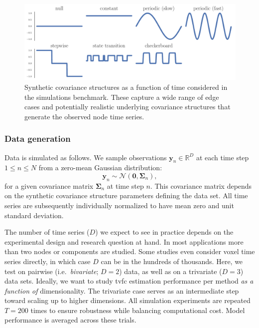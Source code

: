 \begin{figure}[t]
  \centering
  \includegraphics[width=\textwidth]{fig/sim/covariance_structures}
  \caption{
    Synthetic covariance structures as a function of time considered in the simulations benchmark.
    These capture a wide range of edge cases and potentially realistic underlying covariance structures that generate the observed node time series.
  }\label{fig:synthetic-covariance-structures}
\end{figure}


\subsubsection{Data generation}

Data is simulated as follows.
We sample observations $\mathbf{y}_n \in \mathbb{R}^D$ at each time step~$1 \leq n \leq N$ from a zero-mean Gaussian distribution:
\begin{equation}
  \mathbf{y}_n \sim \mathcal{N}(\mathbf{0}, \mathbf{\Sigma}_n),
  \label{eq:data-generation}
\end{equation}
for a given covariance matrix $\mathbf{\Sigma}_n$ at time step $n$.
This covariance matrix depends on the synthetic covariance structure parameters defining the data set.
All time series are subsequently individually normalized to have mean zero and unit standard deviation.

The number of time series ($D$) we expect to see in practice depends on the experimental design and research question at hand.
In most applications more than two nodes or components are studied.
Some studies even consider voxel time series directly, in which case $D$ can be in the hundreds of thousands.
Here, we test on pairwise (i.e.~\emph{bivariate}; $D = 2$) data, as well as on a trivariate ($D = 3$) data sets.
Ideally, we want to study \gls{tvfc} estimation performance per method \emph{as a function of} dimensionality.
The trivariate case serves as an intermediate step toward scaling up to higher dimensions.
All simulation experiments are repeated $T = 200$ times to ensure robustness while balancing computational cost.
Model performance is averaged across these trials.

